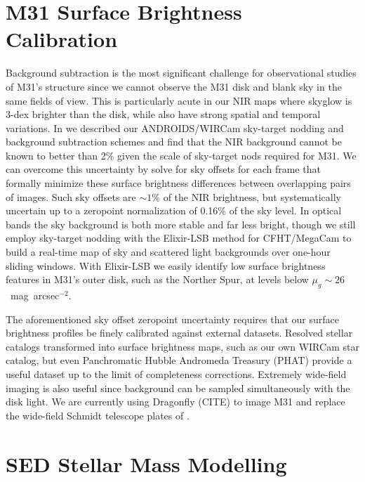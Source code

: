 \documentclass{iau}
\begin{document}
\section{M31 Surface Brightness Calibration}

Background subtraction is the most significant challenge for observational studies of M31's structure since we cannot observe the M31 disk and blank sky in the same fields of view.
This is particularly acute in our NIR maps where skyglow is 3-dex brighter than the disk, while also have strong spatial and temporal variations.
In \cite{Sick:2014} we described our ANDROIDS/WIRCam sky-target nodding and background subtraction schemes and find that the NIR background cannot be known to better than 2\% given the scale of sky-target nods required for M31.
We can overcome this uncertainty by solve for sky offsets for each frame that formally minimize these surface brightness differences between overlapping pairs of images.
Such sky offsets are $\sim1$\% of the NIR brightness, but systematically uncertain up to a zeropoint normalization of 0.16\% of the sky level.
In optical bands the sky background is both more stable and far less bright, though we still employ sky-target nodding with the Elixir-LSB method for CFHT/MegaCam to build a real-time map of sky and scattered light backgrounds over one-hour sliding windows.
With Elixir-LSB we easily identify low surface brightness features in M31's outer disk, such as the Norther Spur, at levels below $\mu_g\sim26$~mag~arcsec$^{-2}$.

The aforementioned sky offset zeropoint uncertainty requires that our surface brightness profiles be finely calibrated against external datasets.
Resolved stellar catalogs transformed into surface brightness maps, such as our own WIRCam star catalog, but even Panchromatic Hubble Andromeda Treasury (PHAT) provide a useful dataset up to the limit of completeness corrections.
Extremely wide-field imaging is also useful since background can be sampled simultaneously with the disk light.
We are currently using Dragonfly (CITE) to image M31 and replace the wide-field Schmidt telescope plates of \cite{Walterbos:1987}.

\section{SED Stellar Mass Modelling}
\end{document}
